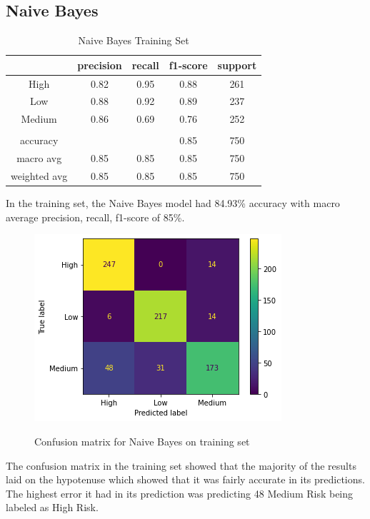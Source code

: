 \documentclass[runningheads]{llncs}
\begin{document}
\subsection{Naive Bayes}

\begin{table}[ht]
\centering
\caption{Naive Bayes Training Set} \vspace{0.25em}
\begin{tabular}{|c|c|c|c|c|} \hline
 & precision & recall & f1-score & support \\ \hline
High   & 0.82 & 0.95 & 0.88 & 261 \\ \hline
Low    & 0.88 & 0.92 & 0.89 & 237 \\ \hline
Medium & 0.86 & 0.69 & 0.76 & 252 \\ \hline
& & & & \\ \hline
accuracy     & & & 0.85 & 750 \\ \hline
macro avg    & 0.85 & 0.85 & 0.85 & 750 \\ \hline
weighted avg & 0.85 & 0.85 & 0.85 & 750 \\ \hline
\end{tabular}
\label{tab:naivebayes-training}
\end{table}

In the training set, the Naive Bayes model had 84.93\% accuracy with macro average precision, recall, f1-score of 85\%. 

\begin{figure}[ht]           	 
\centering               	 
\caption{Confusion matrix for Naive Bayes on training set}
\includegraphics[scale=0.5]{naivebayes-CM-training.png}  	 
\label{fig:naivebayes-CM-training}
\end{figure}

The confusion matrix in the training set showed that the majority of the results laid on the hypotenuse which showed that it was fairly accurate in its predictions. The highest error it had in its prediction was predicting 48 Medium Risk being labeled as High Risk.
\newpage
\end{document}
